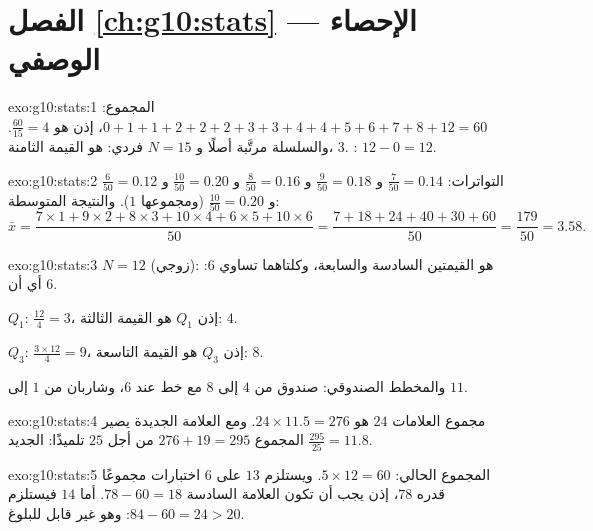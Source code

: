 \section*{الفصل \ref{ch:g10:stats} --- الإحصاء الوصفي}

\begin{solution}{exo:g10:stats:1}
المجموع: $0+1+1+2+2+2+3+3+4+4+5+6+7+8+12 = 60$، إذن  هو
$\frac{60}{15} = 4$. والسلسلة مرتَّبة أصلًا و $N = 15$ فردي:
 هو القيمة الثامنة، $3$. : $12 - 0 = 12$.
\end{solution}

\begin{solution}{exo:g10:stats:2}
التواترات: $\frac{7}{50} = 0.14$ و $\frac{9}{50} = 0.18$ و
$\frac{8}{50} = 0.16$ و $\frac{10}{50} = 0.20$ و $\frac{6}{50} = 0.12$ و
$\frac{10}{50} = 0.20$ (ومجموعها $1$). والنتيجة المتوسطة:
\[
\bar x = \frac{7 \times 1 + 9 \times 2 + 8 \times 3 + 10 \times 4
+ 6 \times 5 + 10 \times 6}{50}
= \frac{7 + 18 + 24 + 40 + 30 + 60}{50}
= \frac{179}{50} = 3.58 .
\]
\end{solution}

\begin{solution}{exo:g10:stats:3}
$N = 12$ (زوجي):  هو  القيمتين السادسة والسابعة،
وكلتاهما تساوي $6$: أي أن  $6$.

$Q_1$: $\frac{12}{4} = 3$، إذن $Q_1$ هو القيمة الثالثة: $4$.

$Q_3$: $\frac{3 \times 12}{4} = 9$، إذن $Q_3$ هو القيمة التاسعة: $8$.

والمخطط الصندوقي: صندوق من $4$ إلى $8$ مع خط  عند $6$، وشاربان من
$1$ إلى $11$.
\end{solution}

\begin{solution}{exo:g10:stats:4}
مجموع العلامات $24$ هو $24 \times 11.5 = 276$. ومع العلامة الجديدة يصير
المجموع $276 + 19 = 295$ من أجل $25$ تلميذًا:  الجديد
$\frac{295}{25} = 11.8$.
\end{solution}

\begin{solution}{exo:g10:stats:5}
المجموع الحالي: $5 \times 12 = 60$. ويستلزم  $13$ على $6$ اختبارات
مجموعًا قدره $78$، إذن يجب أن تكون العلامة السادسة $78 - 60 = 18$. أما 
$14$ فيستلزم $84 - 60 = 24 > 20$: وهو غير قابل للبلوغ.
\end{solution}

